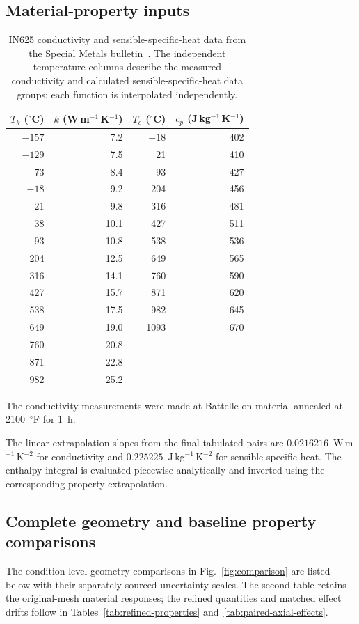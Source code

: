 \documentclass[preprint,12pt]{elsarticle}
\begin{document}
\subsection{Material-property inputs}

\begin{table}[htbp]
\centering
\caption{IN625 conductivity and sensible-specific-heat data from the Special Metals bulletin~\cite{specialmetals625}. The independent temperature columns describe the measured conductivity and calculated sensible-specific-heat data groups; each function is interpolated independently.}
\label{tab:properties}
\begin{tabular}{rrrr}
\toprule
$T_k$ ($^\circ$C) & $k$ (W\,m$^{-1}$\,K$^{-1}$) & $T_c$ ($^\circ$C) & $c_p$ (J\,kg$^{-1}$\,K$^{-1}$)\\
\midrule
$-157$ & 7.2 & $-18$ & 402\\
$-129$ & 7.5 & 21 & 410\\
$-73$ & 8.4 & 93 & 427\\
$-18$ & 9.2 & 204 & 456\\
21 & 9.8 & 316 & 481\\
38 & 10.1 & 427 & 511\\
93 & 10.8 & 538 & 536\\
204 & 12.5 & 649 & 565\\
316 & 14.1 & 760 & 590\\
427 & 15.7 & 871 & 620\\
538 & 17.5 & 982 & 645\\
649 & 19.0 & 1093 & 670\\
760 & 20.8 & & \\
871 & 22.8 & & \\
982 & 25.2 & & \\
\bottomrule
\end{tabular}
\end{table}


The conductivity measurements were made at Battelle on material annealed at 2100~$^\circ$F for 1~h.

The linear-extrapolation slopes from the final tabulated pairs are $0.0216216$~W\,m$^{-1}$\,K$^{-2}$ for conductivity and $0.225225$~J\,kg$^{-1}$\,K$^{-2}$ for sensible specific heat. The enthalpy integral is evaluated piecewise analytically and inverted using the corresponding property extrapolation.


\subsection{Complete geometry and baseline property comparisons}
The condition-level geometry comparisons in Fig.~\ref{fig:comparison} are listed below with their separately sourced uncertainty scales. The second table retains the original-mesh material responses; the refined quantities and matched effect drifts follow in Tables~\ref{tab:refined-properties} and~\ref{tab:paired-axial-effects}.
\end{document}
